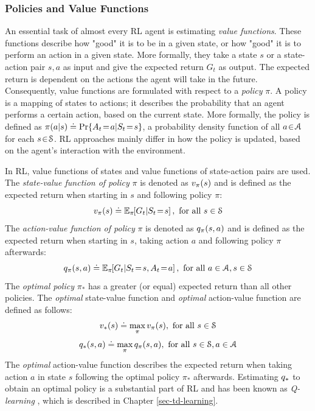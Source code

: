 \documentclass[a4paper, 12pt]{article}
\let\cite\shortcite
\begin{document}
\subsubsection{Policies and Value Functions \label{sec-policies}}
\label{sec:org94a870a}
An essential task of almost every RL agent is estimating \emph{value functions}.
These functions describe how "good" it is to be in a given state, or how "good"
it is to perform an action in a given state. More formally, they take a state
\(s\) or a state-action pair \(s,a\) as input and give the expected return \(G_t\) as
output. The expected return is dependent on the actions the agent will take in
the future. Consequently, value functions are formulated with respect to a
\emph{policy} \(\pi\). A policy is a mapping of states to actions; it describes the
probability that an agent performs a certain action, based on the current state.
More formally, the policy is defined as
\(\pi(a|s)\defeq\Pr{A_t\!=\!a|S_t\!=\!s}\), a probability density function of all
\(a\!\in\!\A\) for each \(s\!\in\!\S\). RL approaches mainly differ in how the
policy is updated, based on the agent's interaction with the environment.

In RL, value functions of states and value functions of state-action pairs are
used. The \emph{state-value function of policy} \(\pi\) is denoted as \(\vpi(s)\) and is
defined as the expected return when starting in \(s\) and following policy \(\pi\):
\begin{equation}
    \vpi(s) \defeq \EE{\pi}{G_t|S_t\!=\!s}, \text{ for all } s\in\S
\end{equation}
The \emph{action-value function of policy} \(\pi\) is denoted as \(\qpi(s,a)\) and is
defined as the expected return when starting in \(s\), taking action \(a\) and
following policy \(\pi\) afterwards:
\begin{equation}
    \qpi(s,a) \defeq \EE{\pi}{G_t|S_t\!=\!s, A_t\!=\!a}, \text{ for all } a\in\A, s\in\S
\end{equation}
The \emph{optimal policy} \(\pi_*\) has a greater (or equal) expected return than all
other policies. The \emph{optimal} state-value function and \emph{optimal} action-value
function are defined as follows:
\begin{equation}
    \vstar(s) \defeq \max_{\pi} \vpi(s), \text{ for all } s\in\S
\end{equation}
\begin{equation}
    \qstar(s,a) \defeq \max_{\pi} \qpi(s,a), \text{ for all } s\in\S, a\in\A
\end{equation}
The \emph{optimal} action-value function describes the expected return when taking
action \(a\) in state \(s\) following the optimal policy \(\pi_*\) afterwards.
Estimating \(\qstar\) to obtain an optimal policy is a substantial part of RL and
has been known as \emph{Q-learning} \cite{watkins92_q_learn}, which is described in
Chapter \ref{sec-td-learning}.
\end{document}
